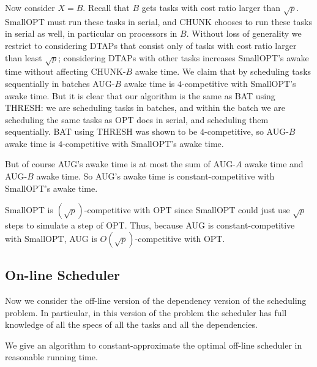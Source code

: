 Now consider $X=B$. Recall that $B$ gets tasks with cost ratio
larger than $\sqrt{p}$. SmallOPT must run these tasks in serial,
and CHUNK chooses to run these tasks in serial as well, in
particular on processors in $B$. Without loss of generality we
restrict to considering DTAPs that consist only of tasks with
cost ratio larger than least $\sqrt{p}$; considering DTAPs with
other tasks increases SmallOPT's awake time without affecting
CHUNK-$B$ awake time. We claim that by scheduling tasks
sequentially in batches AUG-$B$ awake time is $4$-competitive with SmallOPT's
awake time. But it is clear that our algorithm is the same as BAT using
THRESH: we are scheduling tasks in batches,
and within the batch we are scheduling the same tasks as OPT does
in serial, and scheduling them sequentially. BAT using THRESH was
shown to be $4$-competitive, so AUG-$B$ awake time is
$4$-competitive with SmallOPT's awake time.

But of course AUG's awake time is at most the sum of AUG-$A$
awake time and AUG-$B$ awake time. So AUG's awake time is
constant-competitive with SmallOPT's awake time.

SmallOPT is $(\sqrt{p})$-competitive with OPT since SmallOPT
could just use $\sqrt{p}$ steps to simulate a step of OPT. Thus,
because AUG is constant-competitive with SmallOPT, AUG is
$O(\sqrt{p})$-competitive with OPT. 

\subsection{On-line Scheduler}
Now we consider the off-line version of the dependency version of
the scheduling problem. In particular, in this version of the
problem the scheduler has full knowledge of all the specs of all
the tasks and all the dependencies.

We give an algorithm to constant-approximate the optimal off-line
scheduler in reasonable running time.


